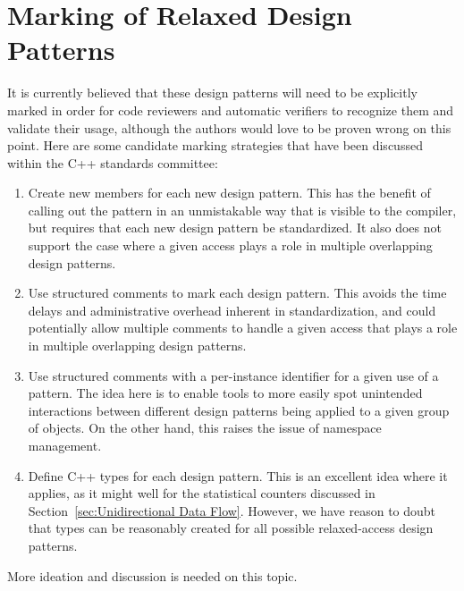 \documentclass[10]{article}
\begin{document}
\section{Marking of Relaxed Design Patterns}
\label{sec:Marking of Relaxed Design Patterns}

It is currently believed that these design patterns will need to be
explicitly marked in order for code reviewers and automatic verifiers
to recognize them and validate their usage, although the authors would
love to be proven wrong on this point.
Here are some candidate marking strategies that have been discussed
within the C++ standards committee:

\begin{enumerate}
\item	Create new   members for each new
	design pattern.
	This has the benefit of calling out the pattern in an unmistakable
	way that is visible to the compiler, but requires that each
	new design pattern be standardized.
	It also does not support the case where a given access plays a
	role in multiple overlapping design patterns.
\item	Use structured comments to mark each design pattern.
	This avoids the time delays and administrative overhead inherent
	in standardization, and could potentially allow multiple comments
	to handle a given access that plays a role in multiple overlapping
	design patterns.
\item	Use structured comments with a per-instance identifier for
	a given use of a pattern.
	The idea here is to enable tools to more easily spot
	unintended interactions between different design patterns
	being applied to a given group of objects.
	On the other hand, this raises the issue of namespace management.
\item	Define C++  types for each design pattern.
	This is an excellent idea where it applies, as it might well
	for the statistical counters discussed in
	Section~\ref{sec:Unidirectional Data Flow}.
	However, we have reason to doubt that  types can
	be reasonably created for all possible relaxed-access design
	patterns.
\end{enumerate}

More ideation and discussion is needed on this topic.

% 
\end{document}
